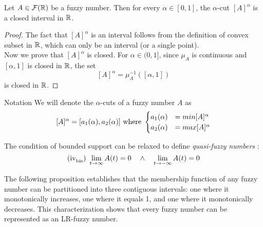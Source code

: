\begin{proposition}
    Let $A\in \fuzzy{\R}$ be a fuzzy number. Then for every $\alpha \in [0,1]$, the $\alpha$-cut $[A]^\alpha$ is a closed interval in $\R$.
\end{proposition}

\begin{proof}
The fact that $[A]^\alpha$ is an interval follows from the definition of convex subset in $\R$, which can only be an interval (or a single point).\\
Now we prove that $[A]^\alpha$ is closed. For $\alpha \in (0,1]$, since $\mu_A$ is continuous and $[\alpha, 1]$ is closed in $\R$, the set
\[
[A]^\alpha = \mu_A^{-1}([\alpha, 1])
\]
is closed in $\R$. %
\end{proof}

\begin{notation}{Notation}
    We will denote the $\alpha$-cuts of a fuzzy number $A$ as 
    \[[A]^\alpha=[a_1(\alpha),a_2(\alpha)]\textnormal{ where }\begin{cases}
        a_1(\alpha)&=min[A]^\alpha\\
        a_2(\alpha)&=max[A]^\alpha\\
    \end{cases}\]
\end{notation}

\begin{note}
The condition of bounded support can be relaxed to define \textit{quasi-fuzzy numbers} :
$$\textnormal{(iv}_{\textnormal{bis}}\textnormal{) } \lim{t}{\infty}A(t) = 0 \quad \land \quad \lim{t}{-\infty}A(t) = 0$$
\end{note}

The following proposition establishes that the membership function of any fuzzy number can be partitioned into three contiguous intervals: one where it monotonically increases, one where it equals 1, and one where it monotonically decreases. This characterization shows that every fuzzy number can be represented as an LR-fuzzy number.



